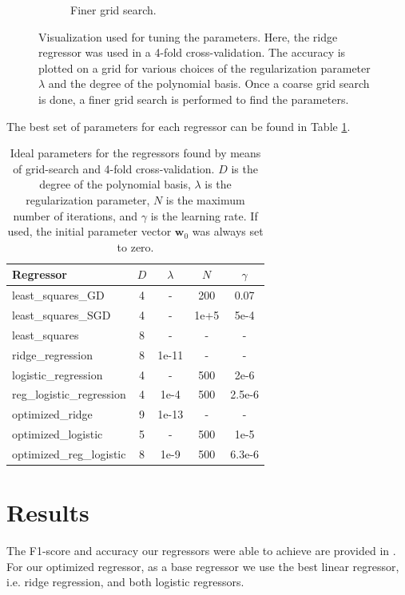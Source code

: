 \documentclass[11pt, a4paper, twocolumn]{article}
\begin{document}
\begin{figure}[htp]
\begin{subfigure}[b]{0.49\columnwidth}
         \caption{Finer grid search.}
     \end{subfigure}
    \caption{Visualization used for tuning the parameters. Here, the ridge regressor was used in a 4-fold cross-validation. The accuracy is plotted on a grid for various choices of the regularization parameter $\lambda$ and the degree of the polynomial basis. Once a coarse grid search is done, a finer grid search is performed to find the parameters.}
    \label{fig:paramter_grid_search}
\end{figure}

The best set of parameters for each regressor can be found in Table \ref{tab:params}.

\begin{table}[ht]
    \caption{Ideal parameters for the regressors found by means of grid-search and 4-fold cross-validation. $D$ is the degree of the polynomial basis, $\lambda$ is the regularization parameter, $N$ is the maximum number of iterations, and $\gamma$ is the learning rate. If used, the initial parameter vector $\boldsymbol{w}_0$ was always set to zero.}
    \label{tab:params}
    \small
    \centering
    \renewcommand{\arraystretch}{1.1}
    \begin{tabular}{@{}lcccc@{}}
        \toprule
        Regressor & $D$ & $\lambda$ & $N$ & $\gamma$ \\
        \midrule
        least\_squares\_GD & 4 & - & 200 & 0.07 \\
        least\_squares\_SGD & 4 & - & 1e+5 & 5e-4 \\
        least\_squares & 8 & - & - & -  \\
        ridge\_regression & 8 & 1e-11 & - & - \\
        logistic\_regression & 4 & - & 500 & 2e-6 \\
        reg\_logistic\_regression & 4 & 1e-4 & 500 & 2.5e-6 \\
        optimized\_ridge & 9 & 1e-13 & - & - \\
        optimized\_logistic & 5 & - & 500 & 1e-5 \\
        optimized\_reg\_logistic & 8 & 1e-9 & 500 & 6.3e-6 \\
        \bottomrule
    \end{tabular}
\end{table}

\section{Results}
\label{sec:results}
The F1-score and accuracy our regressors were able to achieve are provided in . For our optimized regressor, as a base regressor we use the best linear regressor, i.e. ridge regression, and both logistic regressors.
\end{document}
